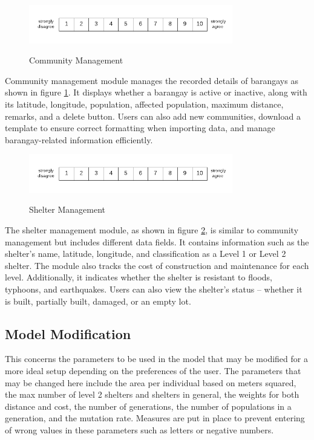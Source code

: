 	\begin{figure}[h!]
		\caption{Community Management}
		\centering
		\includegraphics[width=3.5in]{Nrs-10}
		\label{commMan}
	\end{figure}
	Community management module manages the recorded details of barangays as shown in figure \ref{commMan}. It displays whether a barangay is active or inactive, along with its latitude, longitude, population, affected population, maximum distance, remarks, and a delete button. Users can also add new communities, download a template to ensure correct formatting when importing data, and manage barangay-related information efficiently.
	
	\begin{figure}[h!]
		\caption{Shelter Management}
		\centering
		\includegraphics[width=3.5in]{Nrs-10}
		\label{shelMan}
	\end{figure}
	The shelter management module, as shown in figure \ref{shelMan}, is similar to community management but includes different data fields. It contains information such as the shelter’s name, latitude, longitude, and classification as a Level 1 or Level 2 shelter. The module also tracks the cost of construction and maintenance for each level. Additionally, it indicates whether the shelter is resistant to floods, typhoons, and earthquakes. Users can also view the shelter’s status – whether it is built, partially built, damaged, or an empty lot.
	
\subsection{Model Modification}
	This concerns the parameters to be used in the model that may be modified for a more ideal setup depending on the preferences of the user. The parameters that may be changed here include the area per individual based on meters squared, the max number of level 2 shelters and shelters in general, the weights for both distance and cost, the number of generations, the number of populations in a generation, and the mutation rate. Measures are put in place to prevent entering of wrong values in these parameters such as letters or negative numbers. 
	
